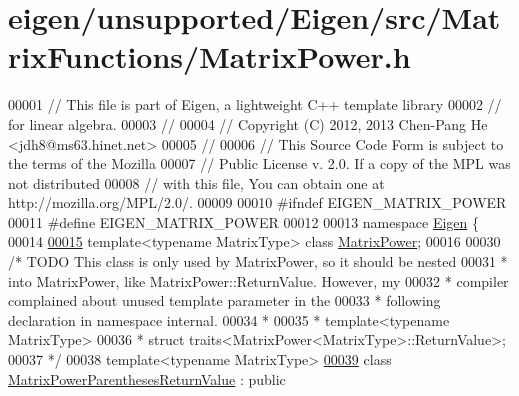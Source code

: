 \hypertarget{eigen_2unsupported_2_eigen_2src_2_matrix_functions_2_matrix_power_8h_source}{}\section{eigen/unsupported/\+Eigen/src/\+Matrix\+Functions/\+Matrix\+Power.h}
\label{eigen_2unsupported_2_eigen_2src_2_matrix_functions_2_matrix_power_8h_source}

\begin{DoxyCode}
00001 \textcolor{comment}{// This file is part of Eigen, a lightweight C++ template library}
00002 \textcolor{comment}{// for linear algebra.}
00003 \textcolor{comment}{//}
00004 \textcolor{comment}{// Copyright (C) 2012, 2013 Chen-Pang He <jdh8@ms63.hinet.net>}
00005 \textcolor{comment}{//}
00006 \textcolor{comment}{// This Source Code Form is subject to the terms of the Mozilla}
00007 \textcolor{comment}{// Public License v. 2.0. If a copy of the MPL was not distributed}
00008 \textcolor{comment}{// with this file, You can obtain one at http://mozilla.org/MPL/2.0/.}
00009 
00010 \textcolor{preprocessor}{#ifndef EIGEN\_MATRIX\_POWER}
00011 \textcolor{preprocessor}{#define EIGEN\_MATRIX\_POWER}
00012 
00013 \textcolor{keyword}{namespace }\hyperlink{namespace_eigen}{Eigen} \{
00014 
\hyperlink{class_eigen_1_1_matrix_power}{00015} \textcolor{keyword}{template}<\textcolor{keyword}{typename} MatrixType> \textcolor{keyword}{class }\hyperlink{class_eigen_1_1_matrix_power}{MatrixPower};
00016 
00030 \textcolor{comment}{/* TODO This class is only used by MatrixPower, so it should be nested}
00031 \textcolor{comment}{ * into MatrixPower, like MatrixPower::ReturnValue. However, my}
00032 \textcolor{comment}{ * compiler complained about unused template parameter in the}
00033 \textcolor{comment}{ * following declaration in namespace internal.}
00034 \textcolor{comment}{ *}
00035 \textcolor{comment}{ * template<typename MatrixType>}
00036 \textcolor{comment}{ * struct traits<MatrixPower<MatrixType>::ReturnValue>;}
00037 \textcolor{comment}{ */}
00038 \textcolor{keyword}{template}<\textcolor{keyword}{typename} MatrixType>
\hyperlink{class_eigen_1_1_matrix_power_parentheses_return_value}{00039} \textcolor{keyword}{class }\hyperlink{class_eigen_1_1_matrix_power_parentheses_return_value}{MatrixPowerParenthesesReturnValue} : \textcolor{keyword}{public} 

\end{DoxyCode}
